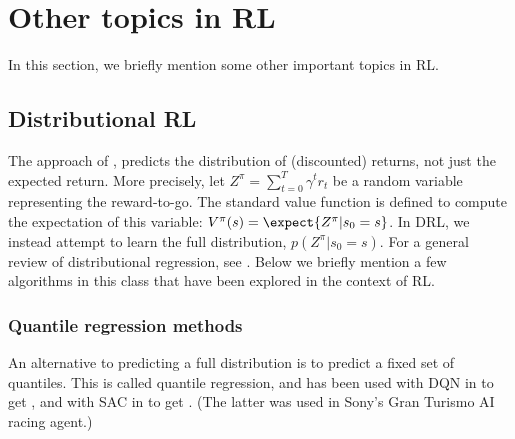 \chapter{Other topics in RL}
\label{sec:rl-other}

In this section, we briefly mention some other important topics in RL.


\section{Distributional RL}
\label{sec:distributional}


The  approach
of \citep{Bellemare2017,BellemareBook},
predicts the distribution of (discounted) returns,
not just the expected return.
More precisely, let $Z^{\pi} = \sum_{t=0}^T \gamma^t r_t$ be a random variable
representing the reward-to-go.
The standard value function is defined to compute the expectation
of this variable: $V^{\pi}(s) = \expect{Z^{\pi}|s_0=s}$.
In DRL, we instead attempt to learn the full distribution,
$p(Z^{\pi}|s_0=s)$.
For a general review of distributional regression,
see \citep{Kneib2023}.
Below  we briefly mention a few algorithms in this class
that have been explored in the context of RL.


\subsection{Quantile regression methods}
\label{sec:QRDQN}

An alternative to predicting a full distribution
is to predict a fixed set of quantiles.
This is called quantile regression,
and has been used with DQN in
\citep{Dabney2017} to get ,
and with SAC in \citep{Wurman2022}
to get .
(The latter  was used in Sony's 
Gran Turismo AI racing agent.)






